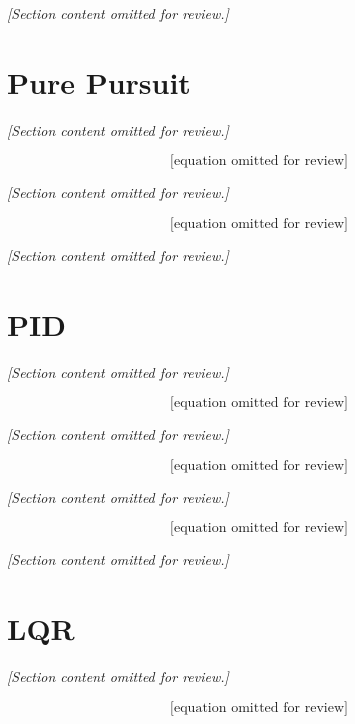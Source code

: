 \textit{[Section content omitted for review.]}

\section{Pure Pursuit}
\label{sec:app_cc_pp}
\textit{[Section content omitted for review.]}

\begin{equation}
\text{[equation omitted for review]}
\label{eq:app_cc_pp_fwd}
\end{equation}

\textit{[Section content omitted for review.]}

\begin{equation}
\text{[equation omitted for review]}
\label{eq:app_cc_pp_rev}
\end{equation}

\textit{[Section content omitted for review.]}

\section{PID}
\label{sec:app_cc_pid}
\textit{[Section content omitted for review.]}

\begin{equation}
\text{[equation omitted for review]}
\label{eq:app_cc_pid_fwd}
\end{equation}

\textit{[Section content omitted for review.]}

\begin{equation}
\text{[equation omitted for review]}
\label{eq:app_cc_pid_rev}
\end{equation}

\textit{[Section content omitted for review.]}

\begin{equation}
\text{[equation omitted for review]}
\label{eq:app_cc_pid_int}
\end{equation}

\textit{[Section content omitted for review.]}

\section{LQR}
\label{sec:app_cc_lqr}
\textit{[Section content omitted for review.]}

\begin{equation}
\text{[equation omitted for review]}
\label{eq:app_cc_lqr_state}
\end{equation}

